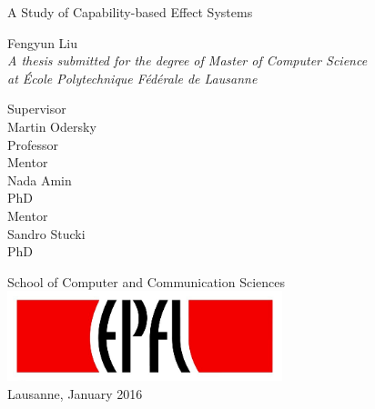 \begin{titlepage}

  \begin{center}

    \vspace*{3\baselineskip}
    {\LARGE A Study of Capability-based Effect Systems\\[2cm] }

    \noindent
    Fengyun Liu \\[2cm]

    \noindent
    \emph{A thesis submitted for the degree of Master of Computer
      Science \\
    at École Polytechnique Fédérale de Lausanne} \\[1.8cm]

    \noindent
    \begin{multicols}{3}
    Supervisor \\
    Martin Odersky \\
    Professor \\
    \vfill
    \columnbreak
    Mentor \\
    Nada Amin \\
    PhD \\
    \vfill
    \columnbreak
    Mentor \\
    Sandro Stucki\\
    PhD \\
    \end{multicols}

    \vspace*{3\baselineskip}

    \noindent
    {School of Computer and Communication Sciences \\[1cm]}
    \includegraphics[width=0.6\textwidth]{img/epfl}~\\[1cm]
    \noindent
    Lausanne, January 2016 \\[1cm]



  \end{center}

\end{titlepage}

